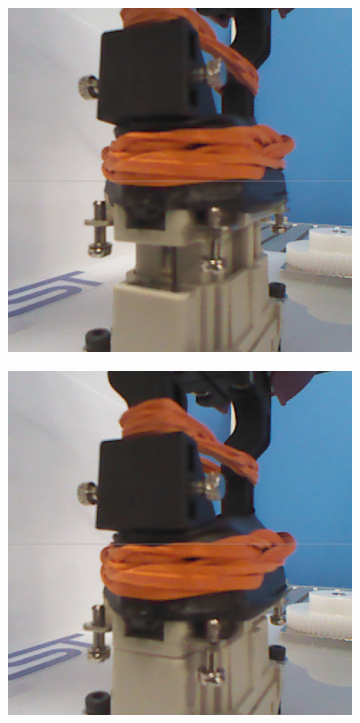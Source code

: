\begin{figure}
{\begin{subfigure}[b]{0.24\linewidth}
        \centering
    \end{subfigure}  
    \begin{subfigure}[b]{0.24\linewidth}
        \includegraphics[width=0.99\linewidth]{insertion/robot_view_screenshots/waterproof_s4_square.png}\\
        \centering
    \end{subfigure} 
    \begin{subfigure}[b]{0.24\linewidth}
        \includegraphics[width=0.99\linewidth]{insertion/robot_view_screenshots/waterproof_s7_square.png}\\

\end{subfigure}}
\end{figure}
